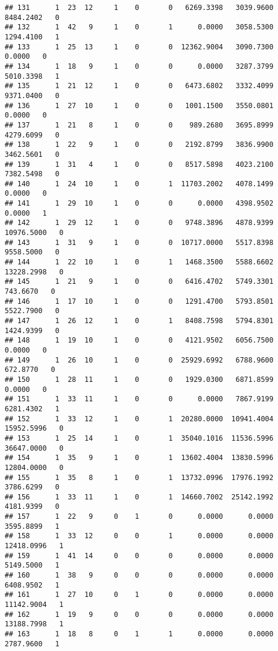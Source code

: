 \documentclass[
]{article}
\begin{document}
\begin{enumerate}
\begin{verbatim}
## 131      1  23  12     1    0       0   6269.3398   3039.9600   8484.2402   0
## 132      1  42   9     1    0       1      0.0000   3058.5300   1294.4100   1
## 133      1  25  13     1    0       0  12362.9004   3090.7300      0.0000   0
## 134      1  18   9     1    0       0      0.0000   3287.3799   5010.3398   1
## 135      1  21  12     1    0       0   6473.6802   3332.4099   9371.0400   0
## 136      1  27  10     1    0       0   1001.1500   3550.0801      0.0000   0
## 137      1  21   8     1    0       0    989.2680   3695.8999   4279.6099   0
## 138      1  22   9     1    0       0   2192.8799   3836.9900   3462.5601   0
## 139      1  31   4     1    0       0   8517.5898   4023.2100   7382.5498   0
## 140      1  24  10     1    0       1  11703.2002   4078.1499      0.0000   0
## 141      1  29  10     1    0       0      0.0000   4398.9502      0.0000   1
## 142      1  29  12     1    0       0   9748.3896   4878.9399  10976.5000   0
## 143      1  31   9     1    0       0  10717.0000   5517.8398   9558.5000   0
## 144      1  22  10     1    0       1   1468.3500   5588.6602  13228.2998   0
## 145      1  21   9     1    0       0   6416.4702   5749.3301    743.6670   0
## 146      1  17  10     1    0       0   1291.4700   5793.8501   5522.7900   0
## 147      1  26  12     1    0       1   8408.7598   5794.8301   1424.9399   0
## 148      1  19  10     1    0       0   4121.9502   6056.7500      0.0000   0
## 149      1  26  10     1    0       0  25929.6992   6788.9600    672.8770   0
## 150      1  28  11     1    0       0   1929.0300   6871.8599      0.0000   0
## 151      1  33  11     1    0       0      0.0000   7867.9199   6281.4302   1
## 152      1  33  12     1    0       1  20280.0000  10941.4004  15952.5996   0
## 153      1  25  14     1    0       1  35040.1016  11536.5996  36647.0000   0
## 154      1  35   9     1    0       1  13602.4004  13830.5996  12804.0000   0
## 155      1  35   8     1    0       1  13732.0996  17976.1992   3786.6299   0
## 156      1  33  11     1    0       1  14660.7002  25142.1992   4181.9399   0
## 157      1  22   9     0    1       0      0.0000      0.0000   3595.8899   1
## 158      1  33  12     0    0       1      0.0000      0.0000  12418.0996   1
## 159      1  41  14     0    0       0      0.0000      0.0000   5149.5000   1
## 160      1  38   9     0    0       0      0.0000      0.0000   6408.9502   1
## 161      1  27  10     0    1       0      0.0000      0.0000  11142.9004   1
## 162      1  19   9     0    0       0      0.0000      0.0000  13188.7998   1
## 163      1  18   8     0    1       1      0.0000      0.0000   2787.9600   1

\end{verbatim}
\end{enumerate}
\end{document}
